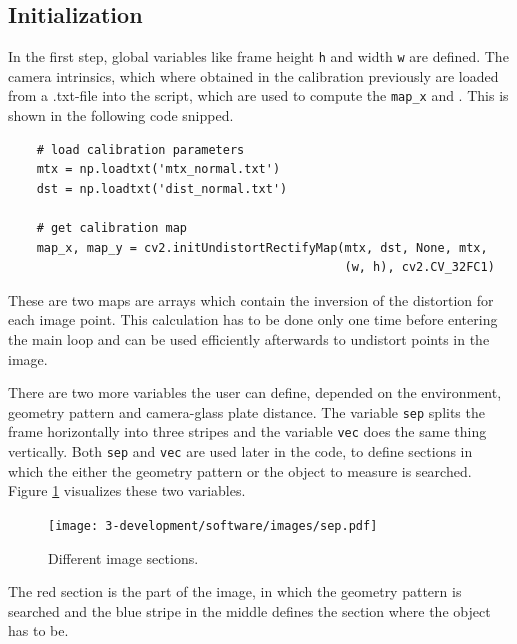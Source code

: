\subsection{Initialization}
In the first step, global variables like frame height \texttt{h} and width \texttt{w} are defined.
The camera intrinsics, which where obtained in the calibration previously are loaded from a .txt-file into the script, which are used to compute the \texttt{map\_x} and .
This is shown in the following code snipped.
\begin{lstlisting}
	# load calibration parameters
	mtx = np.loadtxt('mtx_normal.txt')
	dst = np.loadtxt('dist_normal.txt')

	# get calibration map
	map_x, map_y = cv2.initUndistortRectifyMap(mtx, dst, None, mtx,
	                                           (w, h), cv2.CV_32FC1)
\end{lstlisting}
These are two maps are arrays which contain the inversion of the distortion for each image point.
This calculation has to be done only one time before entering the main loop and can be used efficiently afterwards to undistort points in the image.

There are two more variables the user can define, depended on the environment, geometry pattern and camera-glass plate distance.
The variable \texttt{sep} splits the frame horizontally into three stripes and the variable \texttt{vec} does the same thing vertically.
Both \texttt{sep} and \texttt{vec} are used later in the code, to define sections in which the either the geometry pattern or the object to measure is searched.
Figure \ref{development:sep} visualizes these two variables.
\begin{figure}[ht]
	\centering
	\texttt{[image: 3-development/software/images/sep.pdf]}
	\caption{Different image sections.\label{development:sep}}
\end{figure}
The red section is the part of the image, in which the geometry pattern is searched and the blue stripe in the middle defines the section where the object has to be.

